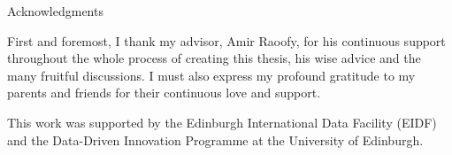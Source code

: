 \thispagestyle{empty}

\vspace*{20mm}

\begin{center}
{ Acknowledgments}
\end{center}

\vspace{10mm}

First and foremost, I thank my advisor, Amir Raoofy, for his continuous support throughout the whole process of creating this thesis, his wise advice and the many fruitful discussions. I must also express my profound gratitude to my parents and friends for their continuous love and support.
\newline
\newline

This work was supported by the Edinburgh International Data Facility (EIDF) and the Data-Driven Innovation Programme at the University of Edinburgh.

\cleardoublepage{}
